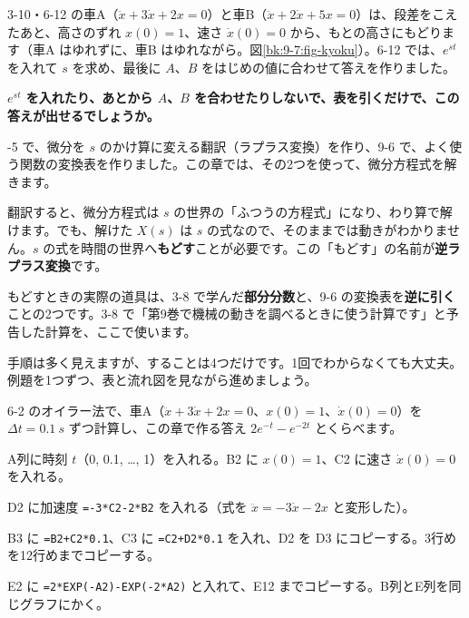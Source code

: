 \begin{hatena}
3-10・6-12 の車A（$\ddot x+3\dot x+2x=0$）と車B（$\ddot x+2\dot x+5x=0$）は、段差をこえたあと、高さのずれ $x(0)=1$、速さ $\dot x(0)=0$ から、もとの高さにもどります（車A はゆれずに、車B はゆれながら。図\ref{bk:9-7:fig-kyoku}）。6-12 では、$e^{st}$ を入れて $s$ を求め、最後に $A$、$B$ をはじめの値に合わせて答えを作りました。\par\vspace{4pt}
\textbf{$e^{st}$ を入れたり、あとから $A$、$B$ を合わせたりしないで、表を引くだけで、この答えが出せるでしょうか。}
\end{hatena}

-5 で、微分を $s$ のかけ算に変える翻訳（ラプラス変換）を作り、9-6 で、よく使う関数の変換表を作りました。この章では、その2つを使って、微分方程式を解きます。

翻訳すると、微分方程式は $s$ の世界の「ふつうの方程式」になり、わり算で解けます。でも、解けた $X(s)$ は $s$ の式なので、そのままでは動きがわかりません。$s$ の式を時間の世界へ\textbf{もどす}ことが必要です。この「もどす」の名前が\textbf{逆ラプラス変換}です。

もどすときの実際の道具は、3-8 で学んだ\textbf{部分分数}と、9-6 の変換表を\textbf{逆に引く}ことの2つです。3-8 で「第9巻で機械の動きを調べるときに使う計算です」と予告した計算を、ここで使います。

手順は多く見えますが、することは4つだけです。1回でわからなくても大丈夫。例題を1つずつ、表と流れ図を見ながら進めましょう。

\begin{yattemiyou}
6-2 のオイラー法で、車A（$\ddot x+3\dot x+2x=0$、$x(0)=1$、$\dot x(0)=0$）を $\Delta t=\qty{0.1}{s}$ ずつ計算し、この章で作る答え $2e^{-t}-e^{-2t}$ とくらべます。
\begin{enumerate}[label={\bkcircled[bkGreen]{\arabic*}}, leftmargin=2.4\zw, itemsep=1pt, topsep=3pt]
\item A列に時刻 $t$（0, 0.1, …, 1）を入れる。B2 に $x(0)=1$、C2 に速さ $\dot x(0)=0$ を入れる。
\item D2 に加速度 \texttt{=-3*C2-2*B2} を入れる（式を $\ddot x=-3\dot x-2x$ と変形した）。
\item B3 に \texttt{=B2+C2*0.1}、C3 に \texttt{=C2+D2*0.1} を入れ、D2 を D3 にコピーする。3行めを12行めまでコピーする。
\item E2 に \texttt{=2*EXP(-A2)-EXP(-2*A2)} と入れて、E12 までコピーする。B列とE列を同じグラフにかく。
\end{enumerate}
\end{yattemiyou}

